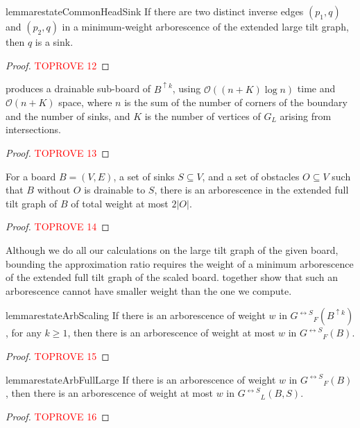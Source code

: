 \documentclass[a4paper,UKenglish,cleveref,thm-restate]{lipics-v2021}
\newcommand{\bScale}[2][k]{\ensuremath{{#2}^{\uparrow {#1}}}}
\newcommand{\gExt}[1][G]{\ensuremath{{#1}^{\leftrightarrow S}}}
\newcommand{\BigO}{\mathcal{O}}
\begin{document}
\begin{restatable}{lemma}{restateCommonHeadSink}\label{common_head_sink}
If there are two distinct inverse edges $(p_1,q)$ and $(p_2,q)$ in a
minimum-weight arborescence of the extended large tilt graph, then $q$ is a
sink.
\end{restatable}
\begin{proof}\textcolor{red}{TOPROVE 12}\end{proof}

\begin{theorem}\label{approx_feasible}
 produces a drainable sub-board of
$\bScale{B}$, using $\BigO((n + K) \log n)$ time and $\BigO(n+K)$ space, where $n$ is
the sum of the number of corners of the boundary and the number of sinks, and
$K$ is the number of vertices of $G_L$ arising from intersections.
\end{theorem}
\begin{proof}\textcolor{red}{TOPROVE 13}\end{proof}

\begin{lemma}\label{lem:obstacle-weight-bound}
For a board $B=(V,E)$, a set of sinks $S \subseteq V$, and a set of obstacles
$O \subseteq V$ such that $B$ without $O$ is drainable to $S$, there is an
arborescence in the extended full tilt graph of $B$ of total weight at most
$2|O|$.
\end{lemma}
\begin{proof}\textcolor{red}{TOPROVE 14}\end{proof}

Although we do all our calculations on the large tilt graph of the given board,
bounding the approximation ratio requires the weight of a minimum arborescence
of the extended full tilt graph of the scaled board.
 together show that such an arborescence
cannot have smaller weight than the one we compute.

\begin{restatable}{lemma}{restateArbScaling}\label{lem:arb-scaling}
If there is an arborescence of weight $w$ in $\gExt_F(\bScale{B})$, for any
$k \geq 1$, then there is an arborescence of weight at most $w$ in $\gExt_F(B)$.
\end{restatable}
\begin{proof}\textcolor{red}{TOPROVE 15}\end{proof}

\begin{restatable}{lemma}{restateArbFullLarge}\label{arb_full_large}
If there is an arborescence of weight $w$ in $\gExt_F(B)$, then there is an
arborescence of weight at most $w$ in $\gExt_L(B,S)$.
\end{restatable}
\begin{proof}\textcolor{red}{TOPROVE 16}\end{proof}
\end{document}

